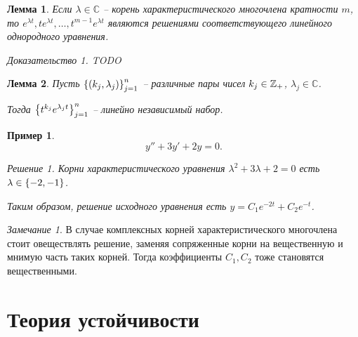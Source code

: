 \documentclass[a5paper, 10pt]{article}
\theoremstyle{definition}
\theoremstyle{plain}
\newtheorem{Lem}{Лемма}
\newtheorem{Ex}{Пример}
\theoremstyle{remark}
\newtheorem*{Note}{Замечание}
\newtheorem*{Solution}{Решение}
\newtheorem*{Proof}{Доказательство}
\begin{document}
	\begin{Lem}
		Если $\lambda \in \mathbb{C}$ -- корень характеристического многочлена кратности $m$, то $e^{\lambda t}, t e^{\lambda t}, \dots, t^{m-1} e^{\lambda t}$ являются решениями соответствующего линейного однородного уравнения.
		\begin{Proof}
			TODO
		\end{Proof}
	\end{Lem}
	\begin{Lem}
		Пусть $\left\{\left(k_j, \lambda_j\right)\right\}_{j=1}^n$ -- различные пары чисел $k_j\in \mathbb{Z}_+$, $\lambda_j \in \mathbb{C}$.
		
		Тогда $\left\{t^{k_j}e^{\lambda_j t}\right\}_{j=1}^n$ -- линейно независимый набор.
	\end{Lem}

	\begin{Ex}
		\[
		y''+3y'+2y = 0.
		\]
		\begin{Solution}
			Корни характеристического уравнения $\lambda^2 + 3 \lambda + 2 = 0$ есть $\lambda \in \left\{-2,-1\right\}$.
			
			Таким образом, решение исходного уравнения есть $y = C_1 e^{-2t} + C_2 e^{-t}$.
		\end{Solution}
	\end{Ex}
	\begin{Note}
		В случае комплексных корней характеристического многочлена стоит овеществлять решение, заменяя сопряженные корни на вещественную и мнимую часть таких корней. Тогда коэффициенты $C_1, C_2$ тоже становятся вещественными.
	\end{Note}

	\part{Теория устойчивости}
\end{document}
